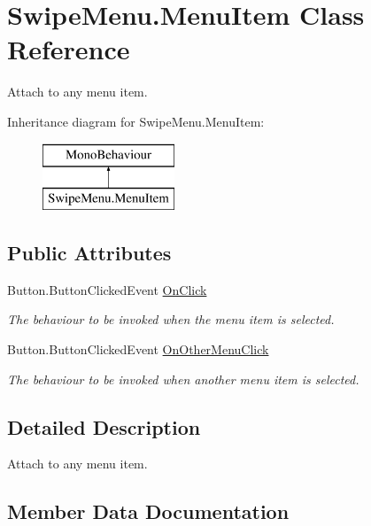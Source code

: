 \hypertarget{class_swipe_menu_1_1_menu_item}{}\section{Swipe\+Menu.\+Menu\+Item Class Reference}
\label{class_swipe_menu_1_1_menu_item}


Attach to any menu item.  


Inheritance diagram for Swipe\+Menu.\+Menu\+Item\+:\begin{figure}[H]
\begin{center}
\leavevmode
\includegraphics[height=2.000000cm]{class_swipe_menu_1_1_menu_item}
\end{center}
\end{figure}
\subsection*{Public Attributes}
\begin{DoxyCompactItemize}
\item 
Button.\+Button\+Clicked\+Event \hyperlink{class_swipe_menu_1_1_menu_item_ad4e6de7e233b0bbce78a6451dcf96cfe}{On\+Click}
\begin{DoxyCompactList}\small\item\em The behaviour to be invoked when the menu item is selected. \end{DoxyCompactList}\item 
Button.\+Button\+Clicked\+Event \hyperlink{class_swipe_menu_1_1_menu_item_a58ec333c2619742ea49b3624ba6f9a23}{On\+Other\+Menu\+Click}
\begin{DoxyCompactList}\small\item\em The behaviour to be invoked when another menu item is selected. \end{DoxyCompactList}\end{DoxyCompactItemize}


\subsection{Detailed Description}
Attach to any menu item. 



\subsection{Member Data Documentation}
\hypertarget{class_swipe_menu_1_1_menu_item_ad4e6de7e233b0bbce78a6451dcf96cfe}{}
